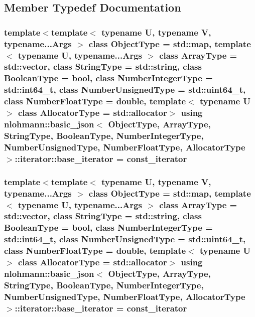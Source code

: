 \subsection{Member Typedef Documentation}
\hypertarget{classnlohmann_1_1basic__json_1_1iterator_ac48754e4dc48d65d95294bd170dcd857}{
\subsubsection[{base\-\_\-iterator}]{\setlength{\rightskip}{0pt plus 5cm}template$<$template$<$ typename U, typename V, typename...\-Args $>$ class Object\-Type = std\-::map, template$<$ typename U, typename...\-Args $>$ class Array\-Type = std\-::vector, class String\-Type  = std\-::string, class Boolean\-Type  = bool, class Number\-Integer\-Type  = std\-::int64\-\_\-t, class Number\-Unsigned\-Type  = std\-::uint64\-\_\-t, class Number\-Float\-Type  = double, template$<$ typename U $>$ class Allocator\-Type = std\-::allocator$>$ using {\bf nlohmann\-::basic\-\_\-json}$<$ Object\-Type, Array\-Type, String\-Type, Boolean\-Type, Number\-Integer\-Type, Number\-Unsigned\-Type, Number\-Float\-Type, Allocator\-Type $>$\-::{\bf iterator\-::base\-\_\-iterator} =  {\bf const\-\_\-iterator}}}\label{classnlohmann_1_1basic__json_1_1iterator_ac48754e4dc48d65d95294bd170dcd857}
\hypertarget{classnlohmann_1_1basic__json_1_1iterator_ac48754e4dc48d65d95294bd170dcd857}{
\subsubsection[{base\-\_\-iterator}]{\setlength{\rightskip}{0pt plus 5cm}template$<$template$<$ typename U, typename V, typename...\-Args $>$ class Object\-Type = std\-::map, template$<$ typename U, typename...\-Args $>$ class Array\-Type = std\-::vector, class String\-Type  = std\-::string, class Boolean\-Type  = bool, class Number\-Integer\-Type  = std\-::int64\-\_\-t, class Number\-Unsigned\-Type  = std\-::uint64\-\_\-t, class Number\-Float\-Type  = double, template$<$ typename U $>$ class Allocator\-Type = std\-::allocator$>$ using {\bf nlohmann\-::basic\-\_\-json}$<$ Object\-Type, Array\-Type, String\-Type, Boolean\-Type, Number\-Integer\-Type, Number\-Unsigned\-Type, Number\-Float\-Type, Allocator\-Type $>$\-::{\bf iterator\-::base\-\_\-iterator} =  {\bf const\-\_\-iterator}}}\label{classnlohmann_1_1basic__json_1_1iterator_ac48754e4dc48d65d95294bd170dcd857}

